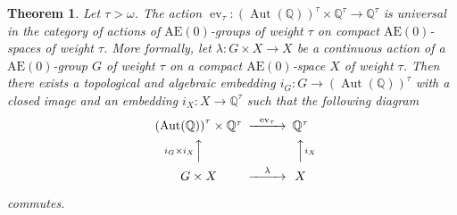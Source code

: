 \documentclass[12pt,draft]{amsart}
\theoremstyle{plain}
\newtheorem{thm}{Theorem}[section]
\theoremstyle{definition}
\numberwithin{equation}{section}
\begin{document}
\begin{thm}\label{T:actionuniv}
Let $\tau > \omega$. The action $\operatorname{ev}_{\tau} \colon
\left(\operatorname{Aut}({\mathbb Q})\right)^{\tau} \times
{\mathbb Q}^{\tau} \to {\mathbb Q}^{\tau}$ is universal
in the category of actions of $\text{AE}(0)$-groups
of weight $\tau$ on  compact $\text{AE}(0)$-spaces of weight
$\tau$. More formally,
let $\lambda \colon G \times X \to X$ be a continuous action of a
$\text{AE}(0)$-group $G$ of weight $\tau$ on a compact
$\text{AE}(0)$-space $X$ of weight
$\tau$. Then there exists a topological and algebraic embedding
$i_{G} \colon G \to \left(\operatorname{Aut}
({\mathbb Q})\right)^{\tau}$ with a closed image and an embedding
$i_{X} \colon X \to {\mathbb Q}^{\tau}$ such that the following diagram
\[
\begin{CD}
\left(\operatorname{Aut}
({\mathbb Q})\right)^{\tau}\times {\mathbb Q}^{\tau}
@>\operatorname{ev}_{\tau}>> {\mathbb Q}^{\tau}\\
@A{i_{G}}\times i_{X}AA @AA{i_{X}}A\\
G \times X @>\lambda>> X
\end{CD}
\]

\noindent commutes.
\end{thm}
\end{document}
